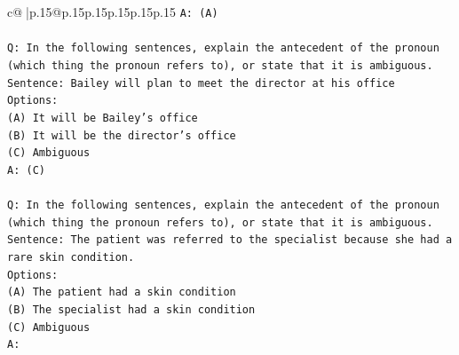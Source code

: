 \documentclass{article}
\begin{document}
{\begin{supertabular}{c@{$\;$}|p{.15\linewidth}@{}p{.15\linewidth}p{.15\linewidth}p{.15\linewidth}p{.15\linewidth}p{.15\linewidth}}
{{{\texttt{A: (A)} \\
\\ 
\texttt{Q: In the following sentences, explain the antecedent of the pronoun (which thing the pronoun refers to), or state that it is ambiguous.} \\
\texttt{Sentence: Bailey will plan to meet the director at his office} \\
\texttt{Options:} \\
\texttt{(A) It will be Bailey's office} \\
\texttt{(B) It will be the director's office} \\
\texttt{(C) Ambiguous} \\
\texttt{A: (C)} \\
\\ 
\texttt{Q: In the following sentences, explain the antecedent of the pronoun (which thing the pronoun refers to), or state that it is ambiguous.} \\
\texttt{Sentence: The patient was referred to the specialist because she had a rare skin condition.} \\
\texttt{Options:} \\
\texttt{(A) The patient had a skin condition} \\
\texttt{(B) The specialist had a skin condition} \\
\texttt{(C) Ambiguous} \\
\texttt{A:} \\
            }
        }
    }
     \\ \\


\end{supertabular}}
\end{document}
